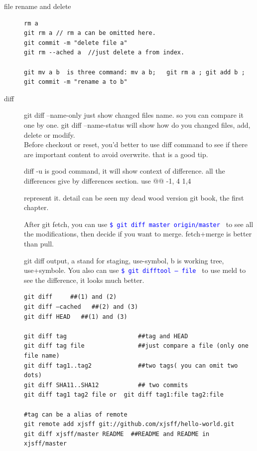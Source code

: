 \documentclass[a4paper,12pt,twoside]{book}
\newcommand{\linuxcommand}[1]{\texttt{\textcolor{blue}{\$ #1 \Pisymbol{psy}{191}}}}
\begin{document}
\begin{description}
\item[file rename and delete]
\begin{verbatim}
rm a
git rm a // rm a can be omitted here.
git commit -m "delete file a"
git rm --ached a  //just delete a from index.

git mv a b  is three command: mv a b;   git rm a ; git add b ;
git commit -m "rename a to b"
\end{verbatim}

\item[diff]

git diff --name-only just show changed files name. so you can compare it one by one.  
git diff --name-status will show how do you changed files, add, delete or modify. \\


Before checkout or reset, you'd better to use diff command to see if there are important content to avoid
    overwrite. that is a good tip. \par

    diff -u is good command, it will show context of difference.  all the differences give by differences section.
    use @@  -1, 4  1,4 \par represent it. detail can be seen my dead wood version git book, the first chapter.

    After git fetch, you can use \linuxcommand{git diff master origin/master} to see all the modifications, then
    decide if you want to merge. fetch+merge is better than pull.
    \par

    git diff output, a stand for staging, use-symbol, b is working tree, use+symbole. You also can use
    \linuxcommand{git difftool -- file} to use meld to see the difference, it looks much better.\par

    \begin{verbatim}
git diff     ##(1) and (2)
git diff –cached   ##(2) and (3)
git diff HEAD   ##(1) and (3)

git diff tag                    ##tag and HEAD
git diff tag file               ##just compare a file (only one file name)
git diff tag1..tag2             ##two tags( you can omit two dots)
git diff SHA11..SHA12           ## two commits
git diff tag1 tag2 file or  git diff tag1:file tag2:file

#tag can be a alias of remote
git remote add xjsff git://github.com/xjsff/hello-world.git
git diff xjsff/master README  ##README and README in xjsff/master
\end{verbatim}



\end{description}
\end{document}
